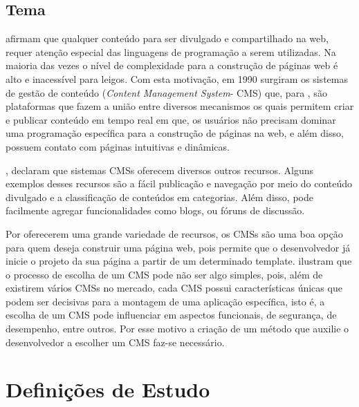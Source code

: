 \section{Tema}
\label{Tema}
 afirmam que qualquer conteúdo para ser divulgado e compartilhado na web, requer atenção especial das linguagens de programação a serem utilizadas. Na maioria das vezes o nível de complexidade para a construção de páginas web é alto e inacessível para leigos. Com esta motivação, em 1990 surgiram os sistemas de gestão de conteúdo (\textit{Content Management System}- CMS) que, para , são plataformas que fazem a união entre diversos mecanismos os quais permitem criar e publicar conteúdo em tempo real em que, os usuários não precisam dominar uma programação específica para a construção de páginas na web, e além disso, possuem contato com páginas intuitivas e dinâmicas.

, declaram que sistemas CMSs oferecem diversos outros recursos. Alguns exemplos desses recursos são a fácil publicação e navegação por meio do conteúdo divulgado e a classificação de conteúdos em categorias. Além disso, pode facilmente agregar funcionalidades como blogs, ou fóruns de discussão.

Por oferecerem uma grande variedade de recursos, os CMSs são uma boa opção para quem deseja construir uma página web, pois permite que o desenvolvedor já inicie o projeto da sua página a partir de um determinado template.   ilustram que o processo de escolha de um CMS pode não ser algo simples, pois, além de existirem vários CMSs no mercado, cada CMS possui características únicas que podem ser decisivas para a montagem de uma aplicação específica, isto é, a escolha de um CMS pode influenciar em aspectos funcionais, de segurança, de desempenho, entre outros. Por esse motivo a criação de um método que auxilie o desenvolvedor a escolher um CMS faz-se necessário.  



\chapter[Definições]{Definições de Estudo}

